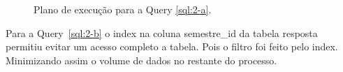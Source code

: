 \documentclass[a4paper,12pt]{article}
\begin{document}
\begin{figure}[hpt]
   \begin{center}
      \\
      \\
   \end{center}
   \caption{Plano de execução para a Query \ref{sql:2-a}.}
   \label{fig:plano_2-a}
\end{figure}

Para a Query~\ref{sql:2-b} o index na coluna semestre\_id da tabela resposta
permitiu evitar um acesso completo a tabela. Pois o filtro foi feito
pelo index. Minimizando assim o volume de dados no restante do processo.

\begin{program}
   
   \caption{Questão 2-b.}
   \label{sql:2-b}
\end{program}
\end{document}
